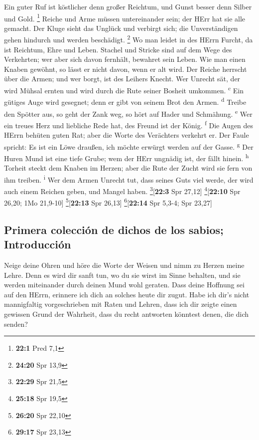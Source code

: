  Ein guter Ruf ist köstlicher denn großer Reichtum, und
Gunst besser denn Silber und Gold. \footnote{\textbf{22:1} Pred 7,1}
 Reiche und Arme müssen untereinander sein; der HErr hat
sie alle gemacht.  Der Kluge sieht das Unglück und
verbirgt sich; die Unverständigen gehen hindurch und werden beschädigt.
\footnote{\textbf{24:20} Spr 13,9}  Wo man leidet in des
HErrn Furcht, da ist Reichtum, Ehre und Leben.  Stachel
und Stricke sind auf dem Wege des Verkehrten; wer aber sich davon
fernhält, bewahret sein Leben.  Wie man einen Knaben
gewöhnt, so lässt er nicht davon, wenn er alt wird.  Der
Reiche herrscht über die Armen; und wer borgt, ist des Leihers Knecht.
 Wer Unrecht sät, der wird Mühsal ernten und wird durch
die Rute seiner Bosheit umkommen. \textsuperscript{c}  Ein
gütiges Auge wird gesegnet; denn er gibt von seinem Brot den Armen.
\textsuperscript{d}  Treibe den Spötter aus, so geht der
Zank weg, so hört auf Hader und Schmähung. \textsuperscript{e}
 Wer ein treues Herz und liebliche Rede hat, des Freund
ist der König. \textsuperscript{f}  Die Augen des HErrn
behüten guten Rat; aber die Worte des Verächters verkehrt er.
 Der Faule spricht: Es ist ein Löwe draußen, ich möchte
erwürgt werden auf der Gasse. \textsuperscript{g}  Der
Huren Mund ist eine tiefe Grube; wem der HErr ungnädig ist, der fällt
hinein. \textsuperscript{h}  Torheit steckt dem Knaben im
Herzen; aber die Rute der Zucht wird sie fern von ihm treiben.
\textsuperscript{i}  Wer dem Armen Unrecht tut, dass
seines Guts viel werde, der wird auch einem Reichen geben, und Mangel
haben. \footnote{\textbf{22:29} Spr 21,5}{[}\textbf{22:3} Spr 27,12{]}
\footnote{\textbf{25:18} Spr 19,5}{[}\textbf{22:10} Spr 26,20; 1Mo
21,9-10{]} \footnote{\textbf{26:20} Spr 22,10}{[}\textbf{22:13} Spr
26,13{]} \footnote{\textbf{29:17} Spr 23,13}{[}\textbf{22:14} Spr 5,3-4;
Spr 23,27{]}

\hypertarget{primera-colecciuxf3n-de-dichos-de-los-sabios-introducciuxf3n}{%
\subsection{Primera colección de dichos de los sabios;
Introducción}\label{primera-colecciuxf3n-de-dichos-de-los-sabios-introducciuxf3n}}

 Neige deine Ohren und höre die Worte der Weisen und nimm
zu Herzen meine Lehre.  Denn es wird dir sanft tun, wo du
sie wirst im Sinne behalten, und sie werden miteinander durch deinen
Mund wohl geraten.  Dass deine Hoffnung sei auf den
HErrn, erinnere ich dich an solches heute dir zugut. 
Habe ich dir's nicht mannigfaltig vorgeschrieben mit Raten und Lehren,
 dass ich dir zeigte einen gewissen Grund der Wahrheit,
dass du recht antworten könntest denen, die dich senden?

